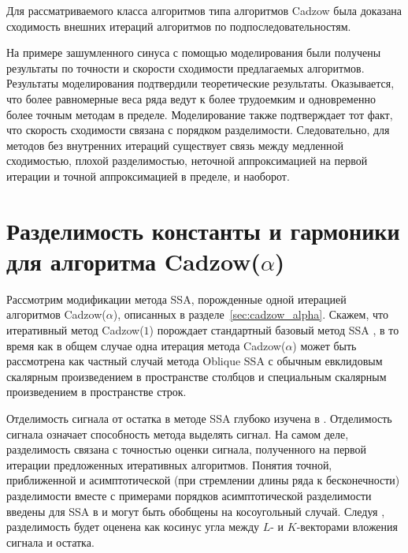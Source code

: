 \documentclass[12pt, specialist, subf,href,colorlinks=true,substylefile = spbu.rtx]{disser}
\theoremstyle{remark}
\theoremstyle{definition}
\begin{document}
Для рассматриваемого класса алгоритмов типа алгоритмов Cadzow была доказана сходимость внешних итераций алгоритмов по подпоследовательностям.

На примере зашумленного синуса с помощью моделирования были получены результаты по точности и скорости сходимости предлагаемых алгоритмов. Результаты моделирования подтвердили теоретические результаты. Оказывается, что более равномерные веса ряда ведут  к более трудоемким и одновременно более точным методам в пределе. Моделирование также подтверждает тот факт, что скорость сходимости связана с порядком разделимости. Следовательно, для методов без внутренних итераций существует связь между медленной сходимостью, плохой разделимостью, неточной аппроксимацией на первой итерации и точной аппроксимацией в пределе, и наоборот.




\appendix 
\chapter{Разделимость константы и гармоники для алгоритма Cadzow($\alpha$)}
\label{sec:app}

Рассмотрим модификации метода SSA, порожденные одной итерацией алгоритмов Cadzow($\alpha$), описанных в разделе~\ref{sec:cadzow_alpha}. Скажем, что итеративный метод Cadzow($1$) порождает стандартный базовый метод SSA \cite{Golyandina.etal2001,Golyandina.Zhigljavsky2012}, в то время как в общем случае одна итерация метода Cadzow($\alpha$) может быть рассмотрена как частный случай метода Oblique SSA \cite{Golyandina2013} с обычным евклидовым скалярным произведением в пространстве столбцов и специальным скалярным произведением в пространстве строк.

Отделимость сигнала от остатка в методе SSA глубоко изучена в \cite{Golyandina.etal2001,Golyandina2010}. Отделимость сигнала означает способность метода выделять сигнал. На самом деле, разделимость связана с точностью оценки сигнала, полученного на первой итерации предложенных итеративных алгоритмов. Понятия точной, приближенной и асимптотической (при стремлении длины ряда к бесконечности) разделимости вместе с примерами порядков асимптотической разделимости введены для SSA в \cite{Golyandina.etal2001} и могут быть обобщены на косоугольный случай. Следуя \cite{Golyandina.etal2001}, разделимость будет оценена как косинус угла между $L$- и $K$-векторами вложения сигнала и остатка.
\end{document}
